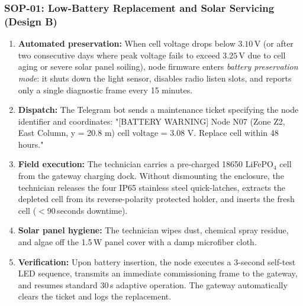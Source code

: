 \documentclass[11pt,a4paper]{report}
\begin{document}
\subsubsection{SOP-01: Low-Battery Replacement and Solar Servicing (Design B)}
\begin{enumerate}[noitemsep]
  \item \textbf{Automated preservation:} When cell voltage drops below $3.10\,\text{V}$ (or after two consecutive days where peak voltage fails to exceed $3.25\,\text{V}$ due to cell aging or severe solar panel soiling), node firmware enters \emph{battery preservation mode}: it shuts down the light sensor, disables radio listen slots, and reports only a single diagnostic frame every 15 minutes.
  \item \textbf{Dispatch:} The Telegram bot sends a maintenance ticket specifying the node identifier and coordinates: \textsf{"[BATTERY WARNING] Node N07 (Zone Z2, East Column, y = 20.8 m) cell voltage = 3.08 V. Replace cell within 48 hours."}
  \item \textbf{Field execution:} The technician carries a pre-charged 18650 LiFePO$_4$ cell from the gateway charging dock. Without dismounting the enclosure, the technician releases the four IP65 stainless steel quick-latches, extracts the depleted cell from its reverse-polarity protected holder, and inserts the fresh cell ($< 90$\,seconds downtime).
  \item \textbf{Solar panel hygiene:} The technician wipes dust, chemical spray residue, and algae off the 1.5\,W panel cover with a damp microfiber cloth.
  \item \textbf{Verification:} Upon battery insertion, the node executes a 3-second self-test LED sequence, transmits an immediate commissioning frame to the gateway, and resumes standard 30\,s adaptive operation. The gateway automatically clears the ticket and logs the replacement.
\end{enumerate}
\end{document}
